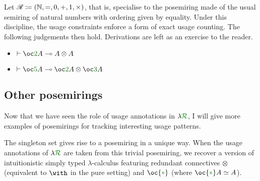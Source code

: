 \begin{example}
  Let $\mathscr R \coloneqq (\mathbb N, =, 0, +, 1, \times)$, that is, specialise to
  the posemiring made of
  the usual semiring of natural numbers with ordering given by equality.
  Under this discipline, the usage constraints enforce a form of exact usage
  counting.
  The following judgements then hold.
  Derivations are left as an exercise to the reader.
  \begin{itemize}
    \item $\vdash \oc\gr2A \multimap A \otimes A$
    \item $\vdash \oc\gr5A \multimap \oc\gr2A \otimes \oc\gr3A$
  \end{itemize}
\end{example}

\subsection{Other posemirings}\label{sec:example-posemirings}

Now that we have seen the role of usage annotations in $\name$, I will give more
examples of posemirings for tracking interesting usage patterns.

\begin{example}\label{def:trivial-posemiring}
  The singleton set gives rise to a posemiring in a unique way.
  When the usage annotations of $\name$ are taken from this trivial posemiring,
  we recover a version of intuitionistic simply typed $\lambda$-calculus
  featuring redundant connectives $\otimes$ (equivalent to $\with$ in the pure
  setting) and $\oc{\gr*}$ (where $\oc{\gr*} A \simeq A$).
\end{example}

